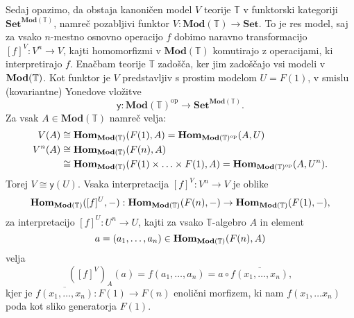 \documentclass[../kategoricna_logika.tex]{subfiles}
\begin{document}
\begin{dokaz}
  Sedaj opazimo, da obstaja kanoničen model $V$ teorije $\mathbb{T}$
  v funktorski kategoriji $\mathbf{Set}^{\mathbf{Mod}(\mathbb{T})}$, namreč
  pozabljivi funktor $V : \mathbf{Mod}(\mathbb{T}) \to \mathbf{Set}$.
  To je res model, saj za vsako $n$-mestno osnovno operacijo $f$ dobimo
  naravno transformacijo $[f]^V : V^n \to V$, kajti homomorfizmi v $\mathbf{Mod}(\mathbb{T})$
  komutirajo z operacijami, ki interpretirajo $f$.
  Enačbam teorije $\mathbb{T}$ zadošča, ker jim zadoščajo vsi modeli v $\mathbf{Mod}(\mathbb{T})$.
  Kot funktor je $V$ predstavljiv s prostim modelom $U = F(1)$, v smislu (kovariantne)
  Yonedove vložitve
  \[ \mathsf{y} : \mathbf{Mod}(\mathbb{T})^{\mathrm{op}} \to \mathbf{Set}^{\mathbf{Mod}(\mathbb{T})}.\]
  Za vsak $A \in \mathbf{Mod}(\mathbb{T})$ namreč velja:
  \begin{align*}
    V(A) &\cong \mathbf{Hom}_{\mathbf{Mod}(\mathbb{T})}(F(1), A) = \mathbf{Hom}_{\mathbf{Mod}(\mathbb{T})^{\mathrm{op}}}(A,U) \\
    V^n(A) &\cong \mathbf{Hom}_{\mathbf{Mod}(\mathbb{T})}(F(n), A) \\
    &\cong \mathbf{Hom}_{\mathbf{Mod}(\mathbb{T})}(F(1) \times \ldots \times F(1), A) = \mathbf{Hom}_{\mathbf{Mod}(\mathbb{T})^{\mathrm{op}}}(A,U^n).
  \end{align*}
  Torej $V \cong \mathsf{y}(U)$. Vsaka interpretacija $[f]^V : V^n \to V$ je oblike
  \[ \mathbf{Hom}_{\mathbf{Mod}(\mathbb{T})}([f]^U, -) : \mathbf{Hom}_{\mathbf{Mod}(\mathbb{T})}(F(n), -) \to \mathbf{Hom}_{\mathbf{Mod}(\mathbb{T})}(F(1), -),\]
  za interpretacijo $[f]^U: U^n \to U$, kajti za vsako $\mathbb{T}$-algebro $A$ in element
  \[a = (a_1, \ldots ,a_n) \in \mathbf{Hom}_{\mathbf{Mod}(\mathbb{T})}(F(n), A)\]
  velja
  \[ ([f]^V)_A(a) = f(a_1, \ldots, a_n) = a \circ \overline{f(x_1, \ldots, x_n)},\]
  kjer je $\overline{f(x_1, \ldots, x_n)} : F(1) \to F(n)$ enolični morfizem, ki nam
  $f(x_1, \ldots x_n)$ poda kot sliko generatorja $F(1)$.


\end{dokaz}
\end{document}
